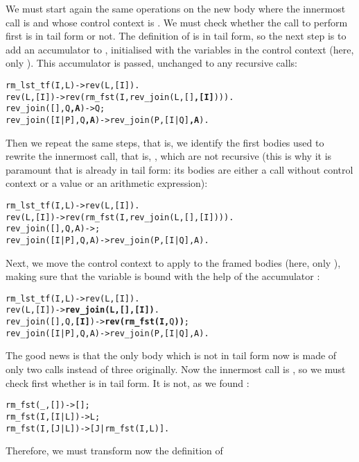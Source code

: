 We must start again the same operations on the new body where the
innermost call is  and whose control context
is . We must check whether
the call to perform first is in tail form or not. The definition of
 is in tail form, so the next step is to add an
accumulator  to , initialised with the
variables in the control context (here, only ). This
accumulator is passed, unchanged to any recursive calls:
\begin{alltt}
rm_lst_tf(I,L)      -> rev(L,[I]).
rev(L,[I])          -> rev(rm_fst(I,rev_join(L,[]\textbf{,[I]}))).
rev_join(   [],Q\textbf{,A}) -> Q;\hfill% A \emph{yet unused}
rev_join([I|P],Q\textbf{,A}) -> rev_join(P,[I|Q]\textbf{,A}).\hfill% \emph{Unchanged}
\end{alltt}
Then we repeat the same steps, that is, we identify the first bodies
used to rewrite the innermost call, that is,
, which are not recursive (this is why it
is paramount that  is already in tail form: its
bodies are either a call without control context or a value or an
arithmetic expression):
\begin{alltt}
rm_lst_tf(I,L)      -> rev(L,[I]).
rev(L,[I])          -> rev(rm_fst(I,rev_join(L,[],[I]))).
rev_join(   [],Q,A) -> ;
rev_join([I|P],Q,A) -> rev_join(P,[I|Q],A).
\end{alltt}
Next, we move the control context
 to apply to the framed
bodies (here, only ), making sure that the variable
 is bound with the help of the accumulator :
\begin{alltt}
rm_lst_tf(I,L)        -> rev(L,[I]).
rev(L,[I])            -> \textbf{rev_join(L,[],[I])}.
rev_join(   [],Q,\textbf{[I]}) -> \textbf{rev(rm_fst(I,}Q\textbf{))};
rev_join([I|P],Q,  A) -> rev_join(P,[I|Q],A).
\end{alltt}
The good news is that the only body which is not in tail form now is
made of only two calls instead of three originally. Now the innermost
call is , so we must check first whether
 is in tail form. It is not, as we found
:
\begin{alltt}
rm_fst(_,   []) -> [];
rm_fst(I,[I|L]) -> L;
rm_fst(I,[J|L]) -> [J|rm_fst(I,L)].\hfill% \emph{Not in tail form}
\end{alltt}
Therefore, we must transform now the definition of 
